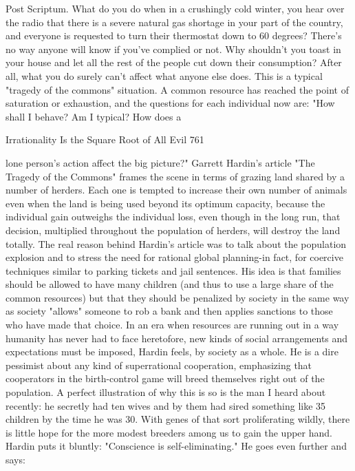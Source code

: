 Post Scriptum.
        What do you do when in a crushingly cold winter, you hear over the radio that
there is a severe natural gas shortage in your part of the country, and everyone is
requested to turn their thermostat down to 60 degrees? There's no way anyone will
know if you've complied or not. Why shouldn't you toast in your house and let all the
rest of the people cut down their consumption? After all, what you do surely can't
affect what anyone else does.
        This is a typical "tragedy of the commons" situation. A common resource has
reached the point of saturation or exhaustion, and the questions for each individual
now are: "How shall I behave? Am I typical? How does a




Irrationality Is the Square Root of All Evil                                         761

lone person's action affect the big picture?" Garrett Hardin's article "The Tragedy of
the Commons" frames the scene in terms of grazing land shared by a number of
herders. Each one is tempted to increase their own number of animals even when the
land is being used beyond its optimum capacity, because the individual gain
outweighs the individual loss, even though in the long run, that decision, multiplied
throughout the population of herders, will destroy the land totally.
        The real reason behind Hardin's article was to talk about the population
explosion and to stress the need for rational global planning-in fact, for coercive
techniques similar to parking tickets and jail sentences. His idea is that families
should be allowed to have many children (and thus to use a large share of the common
resources) but that they should be penalized by society in the same way as society
"allows" someone to rob a bank and then applies sanctions to those who have made
that choice. In an era when resources are running out in a way humanity has never had
to face heretofore, new kinds of social arrangements and expectations must be
imposed, Hardin feels, by society as a whole. He is a dire pessimist about any kind of
superrational cooperation, emphasizing that cooperators in the birth-control game will
breed themselves right out of the population. A perfect illustration of why this is so is
the man I heard about recently: he secretly had ten wives and by them had sired
something like 35 children by the time he was 30. With genes of that sort proliferating
wildly, there is little hope for the more modest breeders among us to gain the upper
hand. Hardin puts it bluntly: "Conscience is self-eliminating." He goes even further
and says:

